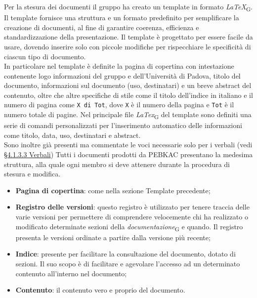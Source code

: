 Per la stesura dei documenti il gruppo ha creato un template in formato \textit{LaTeX}\textsubscript{G}. Il template fornisce una struttura e un formato predefinito per semplificare la creazione di documenti, al fine di garantire coerenza, efficienza e standardizzazione della presentazione. 
Il template è progettato per essere facile da usare, dovendo inserire solo con piccole modifiche per rispecchiare le specificità di ciascun tipo di documento.\\
In particolare nel template è definite la pagina di copertina con intestazione contenente logo informazioni del gruppo e dell'Università di Padova, titolo del documento, informazioni sul documento (uso, destinatari) e un breve abstract del contenuto, oltre che altre specifiche di stile come il titolo dell'indice in italiano e il numero di pagina come \texttt{X di Tot}, dove \texttt{X} è il numero della pagina e \texttt{Tot} è il numero totale di pagine.
Nel principale file \textit{LaTex}\textsubscript{G} del template sono definiti una serie di comandi personalizzati per l'inserimento automatico delle informazioni come titolo, data, uso, destinatari e abstract. \\
Sono inoltre già presenti ma commentate le voci necessarie solo per i verbali (vedi  \hyperref[sec: struttura verbali]{§4.1.3.3 Verbali})
Tutti i documenti prodotti da PEBKAC presentano la medesima struttura, alla quale ogni membro si deve attenere durante la procedura di stesura e modifica.
\begin{itemize}
    \item \textbf{Pagina di copertina}: come nella sezione Template precedente;
    \item \textbf{Registro delle versioni}: questo registro è utilizzato per tenere traccia delle varie versioni per permettere di comprendere velocemente chi ha realizzato o modificato determinate sezioni della \textit{documentazione}\textsubscript{G} e quando. Il registro presenta le versioni ordinate a partire dalla versione più recente;
     \item \textbf{Indice}: presente per facilitare la consultazione del documento, dotato di sezioni. Il suo scopo è di facilitare e agevolare l’accesso ad un determinato contenuto all'interno nel documento;
     \item \textbf{Contenuto}: il contenuto vero e proprio del documento.
\end{itemize}

